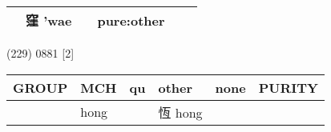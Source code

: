 \documentclass[14pt,a4paper]{scrartcl}
\begin{document}
\begin{longtable}[c]{@{}llllll@{}}
\begin{minipage}[t]{0.14\columnwidth}\raggedright\strut
\strut\end{minipage} &
\begin{minipage}[t]{0.14\columnwidth}\raggedright\strut
窪 'wae
\strut\end{minipage} &
\begin{minipage}[t]{0.14\columnwidth}\raggedright\strut
\strut\end{minipage} &
\begin{minipage}[t]{0.14\columnwidth}\raggedright\strut
pure:other
\strut\end{minipage}\tabularnewline
\bottomrule
\end{longtable}

(229) 0881 {[}2{]}

\begin{longtable}[c]{@{}llllll@{}}
\toprule
\begin{minipage}[b]{0.14\columnwidth}\raggedright\strut
GROUP
\strut\end{minipage} &
\begin{minipage}[b]{0.14\columnwidth}\raggedright\strut
MCH
\strut\end{minipage} &
\begin{minipage}[b]{0.14\columnwidth}\raggedright\strut
qu
\strut\end{minipage} &
\begin{minipage}[b]{0.14\columnwidth}\raggedright\strut
other
\strut\end{minipage} &
\begin{minipage}[b]{0.14\columnwidth}\raggedright\strut
none
\strut\end{minipage} &
\begin{minipage}[b]{0.14\columnwidth}\raggedright\strut
PURITY
\strut\end{minipage}\tabularnewline
\midrule
\endhead
\begin{minipage}[t]{0.14\columnwidth}\raggedright\strut
𢛢
\strut\end{minipage} &
\begin{minipage}[t]{0.14\columnwidth}\raggedright\strut
hong
\strut\end{minipage} &
\begin{minipage}[t]{0.14\columnwidth}\raggedright\strut
\strut\end{minipage} &
\begin{minipage}[t]{0.14\columnwidth}\raggedright\strut
恆 hong
\strut\end{minipage} &
\begin{minipage}[t]{0.14\columnwidth}\raggedright\strut

\end{minipage}
\end{longtable}
\end{document}
